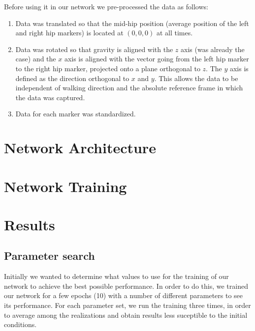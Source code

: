 \documentclass{acm_proc_article-sp}
\begin{document}
Before using it in our network we pre-processed the data as follows:
\begin{enumerate}
 \item Data was translated so that the mid-hip position (average position of the left and right hip markers) is located at $(0,0,0)$ at all times. 
 \item Data was rotated so that gravity is aligned with the $z$ axis (was already the case) and the $x$ axis is aligned with the vector going from the left hip marker to the right hip marker, projected onto a plane orthogonal to $z$. The $y$ axis is defined as the direction orthogonal to $x$ and $y$. This allows the data to be independent of walking direction and the absolute reference frame in which the data was captured.
 \item Data for each marker was standardized.
\end{enumerate}



\section{Network Architecture}
\label{sec:Network Architecture}

\section{Network Training}
\label{sec:Network Training}

\section{Results}
\label{sec:Results}

\subsection{Parameter search}
Initially we wanted to determine what values to use for the training of our network to achieve the best possible performance. In order to do this, we trained our network for a few epochs (10) with a  number of different parameters to see its performance. For each parameter set, we run the training three times, in order to average among the realizations and obtain results less suceptible to the initial conditions.
\end{document}

